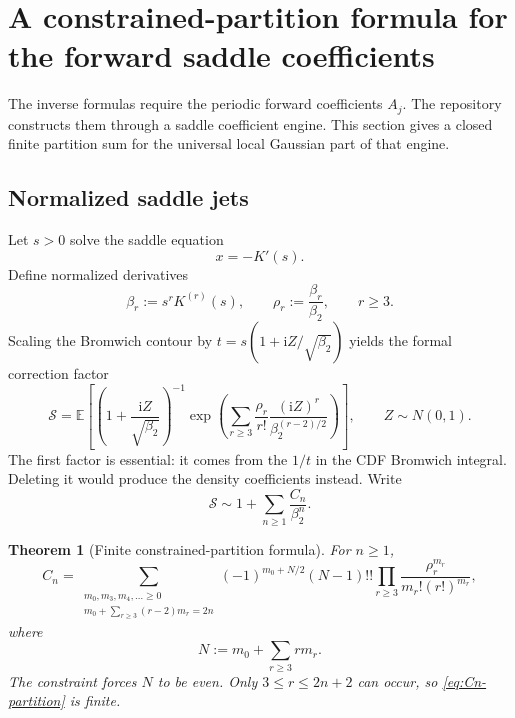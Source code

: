 \documentclass[11pt,oneside]{article}
\numberwithin{equation}{section}
\newtheorem{theorem}{Theorem}[section]
\theoremstyle{definition}
\theoremstyle{remark}
\newcommand{\E}{\mathbb E}
\newcommand{\ii}{\mathrm i}
\begin{document}
\section{A constrained-partition formula for the forward saddle coefficients}
\label{sec:saddle-partitions}

The inverse formulas require the periodic forward coefficients $A_j$.  The
repository constructs them through a saddle coefficient engine.  This section
gives a closed finite partition sum for the universal local Gaussian part of
that engine.

\subsection{Normalized saddle jets}

Let $s>0$ solve the saddle equation
\begin{equation}
 x=-K'(s).
 \label{eq:saddle}
\end{equation}
Define normalized derivatives
\begin{equation}
 \beta_r:=s^rK^{(r)}(s),
 \qquad
 \rho_r:=\frac{\beta_r}{\beta_2},
 \qquad r\ge3.
 \label{eq:beta-rho}
\end{equation}
Scaling the Bromwich contour by
$t=s(1+\ii Z/\sqrt{\beta_2})$ yields the formal correction factor
\begin{equation}
 \mathcal S=
 \E\left[
 \left(1+\frac{\ii Z}{\sqrt{\beta_2}}\right)^{-1}
 \exp\left(
 \sum_{r\ge3}\frac{\rho_r}{r!}
 \frac{(\ii Z)^r}{\beta_2^{(r-2)/2}}
 \right)
 \right],
 \qquad Z\sim N(0,1).
 \label{eq:S-Gaussian}
\end{equation}
The first factor is essential: it comes from the $1/t$ in the CDF Bromwich
integral.  Deleting it would produce the density coefficients instead.
Write
\begin{equation}
 \mathcal S\sim1+\sum_{n\ge1}\frac{C_n}{\beta_2^n}.
 \label{eq:Cn-def}
\end{equation}

\begin{theorem}[Finite constrained-partition formula]
\label{thm:Cn-partition}
For $n\ge1$,
\begin{equation}
\boxed{
 C_n=
 \sum_{\substack{m_0,m_3,m_4,\ldots\ge0\\
 m_0+\sum_{r\ge3}(r-2)m_r=2n}}
 (-1)^{m_0+N/2}(N-1)!!
 \prod_{r\ge3}
 \frac{\rho_r^{m_r}}{m_r!(r!)^{m_r}},}
 \label{eq:Cn-partition}
\end{equation}
where
\begin{equation}
 N:=m_0+\sum_{r\ge3}rm_r.
 \label{eq:N-Gaussian-degree}
\end{equation}
The constraint forces $N$ to be even.  Only $3\le r\le2n+2$ can occur, so
\eqref{eq:Cn-partition} is finite.
\end{theorem}
\end{document}
